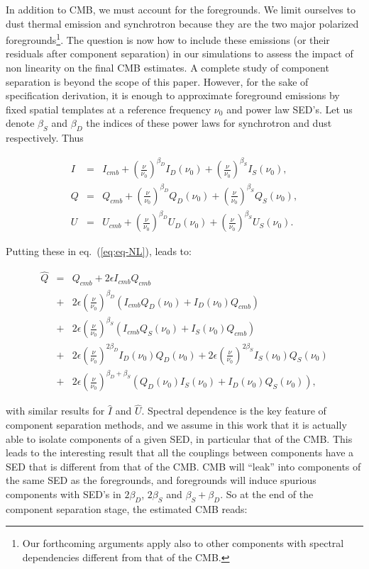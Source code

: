 \noindent In addition to CMB, we must account for the foregrounds. We limit ourselves to
dust thermal emission and synchrotron because they are the two major polarized
foregrounds\footnote{Our forthcoming arguments apply also to other components
  with spectral dependencies different from that of the CMB.}. The question is
now how to include these emissions (or their residuals after component
separation) in our simulations to assess the impact of non linearity on the
final CMB estimates. A complete study of component separation is beyond the
scope of this paper. However, for the sake of specification derivation, it is
enough to approximate foreground emissions by fixed spatial templates at a
reference frequency $\nu_0$ and power law SED's. Let us denote $\beta_S$ and
$\beta_D$ the indices of these power laws for synchrotron and dust
respectively. Thus

\begin{eqnarray}
I&=&I_{cmb} + \left(\frac{\nu}{\nu_0}\right)^{\beta_D}I_D(\nu_0) +
\left(\frac{\nu}{\nu_0}\right)^{\beta_S}I_S(\nu_0), \\
Q&=&Q_{cmb} + \left(\frac{\nu}{\nu_0}\right)^{\beta_D}Q_D(\nu_0) +
\left(\frac{\nu}{\nu_0}\right)^{\beta_S}Q_S(\nu_0), \\
U&=&U_{cmb} + \left(\frac{\nu}{\nu_0}\right)^{\beta_D}U_D(\nu_0) +
\left(\frac{\nu}{\nu_0}\right)^{\beta_S}U_S(\nu_0).
\end{eqnarray}

\noindent Putting these in eq.~(\ref{eq:eq-NL}), leads to:

\begin{eqnarray}
\hat{Q} &=& Q_{cmb} + 2\epsilon I_{cmb}Q_{cmb} \nonumber\\
&+&
2\epsilon\left(\frac{\nu}{\nu_0}\right)^{\beta_D}\left(I_{cmb}Q_D(\nu_0)+I_D(\nu_0)Q_{cmb}\right)\nonumber\\
&+&2\epsilon\left(\frac{\nu}{\nu_0}\right)^{\beta_S}\left(I_{cmb}Q_S(\nu_0)+I_S(\nu_0)Q_{cmb}\right) \nonumber\\
&+&2\epsilon\left(\frac{\nu}{\nu_0}\right)^{2\beta_D}I_D(\nu_0)Q_D(\nu_0) +
2\epsilon\left(\frac{\nu}{\nu_0}\right)^{2\beta_S}I_S(\nu_0)Q_S(\nu_0)\nonumber\\
&+&2\epsilon\left(\frac{\nu}{\nu_0}\right)^{\beta_D+\beta_S}\left(Q_D(\nu_0)I_S(\nu_0)+I_D(\nu_0)Q_S(\nu_0)\right),
\end{eqnarray}

\noindent with similar results for $\hat{I}$ and $\hat{U}$. Spectral dependence is the key
feature of component separation methods, and we assume in this work that it is
actually able to isolate components of a given SED, in particular that of the
CMB. This leads to the interesting result that all the couplings between
components have a SED that is different from that of the CMB. CMB will ``leak''
into components of the same SED as the foregrounds, and foregrounds will induce
spurious components with SED's in $2\beta_D$, $2\beta_S$ and
$\beta_S+\beta_D$. So at the end of the component separation stage, the
estimated CMB reads:

